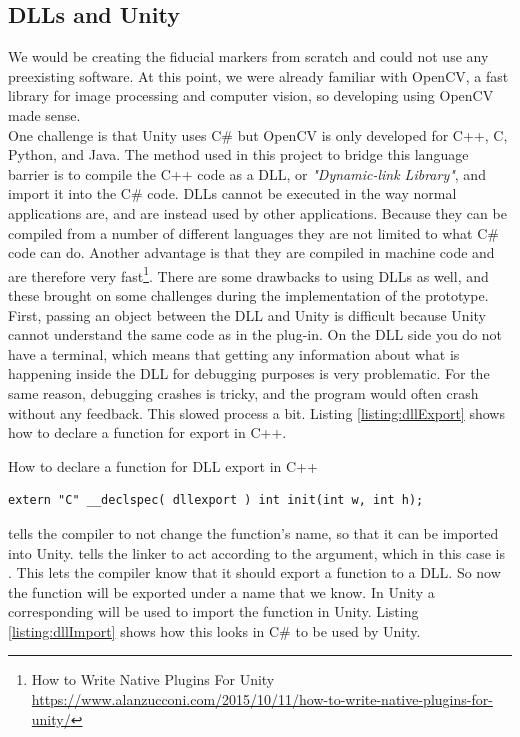 	\subsection{DLLs and Unity}
 		We would be creating the fiducial markers from scratch and could not use any preexisting software. At this point, we were already familiar with OpenCV, a fast library for image processing and computer vision, so developing using OpenCV made sense.\\
 		
		One challenge is that Unity uses C\# but OpenCV is only developed for C++, C, Python, and Java. The method used in this project to bridge this language barrier is to compile the C++ code as a DLL, or \textit{"Dynamic-link Library"}, and import it into the C\# code. DLLs cannot be executed in the way normal applications are, and are instead used by other applications. Because they can be compiled from a number of different languages they are not limited to what C\# code can do. Another advantage is that they are compiled in machine code and are therefore very fast\footnote{How to Write Native Plugins For Unity \url{https://www.alanzucconi.com/2015/10/11/how-to-write-native-plugins-for-unity/}}. There are some drawbacks to using DLLs as well, and these brought on some challenges during the implementation of the prototype. First, passing an object between the DLL and Unity is difficult because Unity cannot understand the same code as in the plug-in. On the DLL side you do not have a terminal, which means that getting any information about what is happening inside the DLL for debugging purposes is very problematic. For the same reason, debugging crashes is tricky, and the program would often crash without any feedback. This slowed process a bit. Listing \ref{listing:dllExport} shows how to declare a function for export in C++.
\begin{listing}[H]
\caption{How to declare a function for DLL export in C++}
\label{listing:dllExport}
\begin{verbatim}
extern "C" __declspec( dllexport ) int init(int w, int h);
\end{verbatim}
\end{listing}
 tells the compiler to not change the function's name, so that it can be imported into Unity.  tells the linker to act according to the argument, which in this case is . This lets the compiler know that it should export a function to a DLL. So now the function will be exported under a name that we know. In Unity a corresponding  will be used to import the function in Unity. Listing \ref{listing:dllImport} shows how this looks in C\# to be used by Unity.
